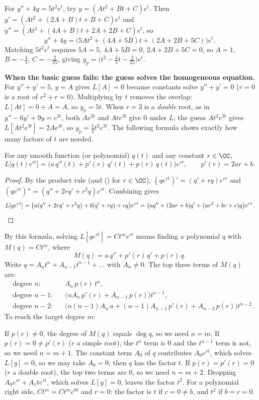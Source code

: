 \documentclass[10pt]{scrartcl}
\begin{document}
\begin{example*}
  For $y''+4y=5t^2e^t$, try $y=(At^2+Bt+C)e^t$. Then $y'=(At^2+(2A+B)t+B+C)e^t$ and $y''=(At^2+(4A+B)t+2A+2B+C)e^t$, so
  \[
    y''+4y = \bigl(5At^2 + (4A+5B)t + (2A+2B+5C)\bigr)e^t.
  \]
  Matching $5t^2e^t$ requires $5A=5$, $4A+5B=0$, $2A+2B+5C=0$, so $A=1$, $B=-\frac45$, $C=-\frac{2}{25}$, giving $y_p=\bigl(t^2-\frac45 t-\frac{2}{25}\bigr)e^t$.
\end{example*}

\noindent\textbf{When the basic guess fails: the guess solves the homogeneous equation.} For $y''+y'=5$, $y=A$ gives $L[A]=0$ because constants solve $y''+y'=0$ ($r=0$ is a root of $r^2+r=0$). Multiplying by $t$ removes the overlap: $L[At]=0+A=A$, so $y_p=5t$. When $r=3$ is a \emph{double} root, as in $y''-6y'+9y=e^{3t}$, both $Ae^{3t}$ and $Ate^{3t}$ give $0$ under $L$; the guess $At^2e^{3t}$ gives $L[At^2e^{3t}]=2Ae^{3t}$, so $y_p=\frac12 t^2e^{3t}$. The following formula shows exactly how many factors of $t$ are needed.

\begin{theorem*}
  For any smooth function (or polynomial) $q(t)$ and any constant $r\in\CC$,
  \[
    L\bigl[q(t)e^{rt}\bigr] = \bigl(a\,q''(t) + p'(r)\,q'(t) + p(r)\,q(t)\bigr)e^{rt}, \qquad p'(r)=2ar+b.
  \]
\end{theorem*}
\begin{proof}
  By the product rule (and () for $r\in\CC$), $(qe^{rt})'=(q'+rq)e^{rt}$ and $(qe^{rt})''=(q''+2rq'+r^2q)e^{rt}$. Combining gives
  \[
    L[qe^{rt}] = \bigl(a(q''+2rq'+r^2q)+b(q'+rq)+cq\bigr)e^{rt} = \bigl(aq''+(2ar+b)q'+(ar^2+br+c)q\bigr)e^{rt}. \qedhere
  \]
\end{proof}

By this formula, solving $L[qe^{rt}]=Ct^m e^{rt}$ means finding a polynomial $q$ with $M(q)=Ct^m$, where
\[
  M(q) = a\,q'' + p'(r)\,q' + p(r)\,q.
\]
Write $q=A_n t^n+A_{n-1}t^{n-1}+\dots$ with $A_n\neq 0$. The top three terms of $M(q)$ are:
\begin{align*}
  &\text{degree }n: && A_n\,p(r)\,t^n,\\
  &\text{degree }n-1: && \bigl(nA_n\,p'(r)+A_{n-1}\,p(r)\bigr)t^{n-1},\\
  &\text{degree }n-2: && \bigl(n(n-1)A_n\,a+(n-1)A_{n-1}\,p'(r)+A_{n-2}\,p(r)\bigr)t^{n-2}.
\end{align*}
To reach the target degree $m$:
\begin{itemize}
  \ii If $p(r)\neq 0$, the degree of $M(q)$ equals $\deg q$, so we need $n=m$.
  \ii If $p(r)=0\neq p'(r)$ ($r$ a simple root), the $t^n$ term is $0$ and the $t^{n-1}$ term is not, so we need $n=m+1$. The constant term $A_0$ of $q$ contributes $A_0e^{rt}$, which solves $L[y]=0$, so we may take $A_0=0$; then $q$ has the factor $t$.
  \ii If $p(r)=p'(r)=0$ ($r$ a double root), the top two terms are $0$, so we need $n=m+2$. Dropping $A_0e^{rt}+A_1te^{rt}$, which solves $L[y]=0$, leaves the factor $t^2$.
  \ii For a polynomial right side, $Ct^m=Ct^me^{0t}$ and $r=0$: the factor is $t$ if $c=0\neq b$, and $t^2$ if $b=c=0$.
\end{itemize}
\end{document}

